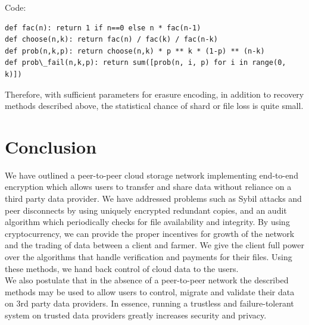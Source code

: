 \documentclass[a4paper,10pt]{article}
\begin{document}
Code:
\begin{lstlisting}
def fac(n): return 1 if n==0 else n * fac(n-1)
def choose(n,k): return fac(n) / fac(k) / fac(n-k) 
def prob(n,k,p): return choose(n,k) * p ** k * (1-p) ** (n-k)
def prob\_fail(n,k,p): return sum([prob(n, i, p) for i in range(0, k)])
\end{lstlisting}
Therefore, with sufficient parameters for erasure encoding, in addition to recovery methods described above, the statistical chance of shard or file loss is quite small. 


\section{Conclusion}
We have outlined a peer-to-peer cloud storage network implementing end-to-end encryption which allows users to transfer and share data without reliance on a third party data provider. We have addressed problems such as Sybil attacks and peer disconnects by using uniquely encrypted redundant copies, and an audit algorithm which periodically checks for file availability and integrity. By using cryptocurrency, we can provide the proper incentives for growth of the network and the trading of data between a client and farmer. We give the client full power over the algorithms that handle verification and payments for their files. Using these methods, we hand back control of cloud data to the users. \\

We also postulate that in the absence of a peer-to-peer network the described methods may be used to allow users to control, migrate and validate their data on 3rd party data providers. In essence, running a trustless and failure-tolerant system on trusted data providers greatly increases security and privacy.\\





\begingroup
  \raggedright
  
\endgroup
\end{document}
